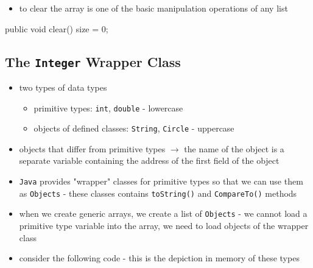 \begin{itemize}
    \item [2.] to clear the array is one of the basic manipulation operations of any list 
\end{itemize}



\noindent
\begin{minipage}{0.35\textwidth}
    \phantom{text}
\end{minipage}
\begin{minipage}{0.3\textwidth}
    \begin{tightcode}
public void clear() {
size = 0;
}
    \end{tightcode}
\end{minipage}

\subsection{The \texttt{Integer} Wrapper Class}

\begin{itemize}
    \item two types of data types 
        \begin{itemize}
            \item \textcolor{RedOrange}{primitive} types: \texttt{int}, \texttt{double} - lowercase
            \item objects of \textcolor{RedOrange}{defined classes}: \texttt{String}, \texttt{Circle} - uppercase
        \end{itemize}
\end{itemize}

\begin{itemize}
    \item objects that differ from primitive types $\rightarrow$ the name of the object is a separate variable containing the address of the first field of the object
    \item \texttt{Java} provides "wrapper" classes for primitive types so that we can use them as \texttt{Objects} - these classes contains \texttt{toString()} and \texttt{CompareTo()} methods 
    \item when we create generic arrays, we create a list of \texttt{Objects} - we cannot load a primitive type variable into the array, we need to load objects of the wrapper class
\end{itemize}

\begin{itemize}
    \item consider the following code - this is the depiction in memory of these types
\end{itemize}

